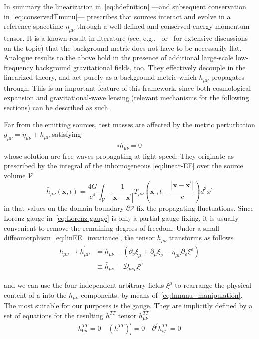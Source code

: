 In summary the linearization in~\eqref{eq:hdefinition} ---and subsequent conservation in~\eqref{eq:conservedTmunu}--- prescribes that \gw sources interact and evolve in a reference spacetime $\eta_{\mu\nu}$ through a well-defined and conserved energy-momentum tensor.
It is a known result in literature (see, e.g.,~\cite{maggiore2008gravitational} or~\cite{2017grav.book.....M} for extensive discussions on the topic) that the background metric does not have to be necessarily flat. Analogue results to the above hold in the presence of additional large-scale low-frequency background gravitational fields, too.
They effectively decouple in the linearized theory, and act purely as a background metric which $h_{\mu\nu}$ propagates through.
This is an important feature of this framework, since both cosmological expansion and gravitational-wave lensing (relevant mechanisms for the following sections) can be described as such.

Far from the emitting sources, test masses are affected by the metric perturbation
$g_{\mu\nu}=\eta_{\mu\nu}+h_{\mu\nu}$ satisfying
\begin{equation}
\square\bar{h}_{\mu\nu}=0
\end{equation}
whose solution are free waves propagating at light speed. They originate as prescribed by the integral of the inhomogeneous \eqref{eq:linear-EE} over the source volume $\mathcal{V}$
\begin{equation}
\bar{h}_{\mu\nu}\left(\boldsymbol{x},t\right)=\frac{4G}{c^{4}}\int_{\mathcal{V}}\frac{1}{\left|\boldsymbol{x}-\boldsymbol{x}^{\prime}\right|}T_{\mu\nu}\left(\boldsymbol{x}^{\prime},t-\frac{\left|\boldsymbol{x}-\boldsymbol{x}^{\prime}\right|}{c}\right)d^{3}x^{\prime}
\end{equation}
in that values on the domain boundary $\partial\mathcal{V}$ fix the propagating fluctuations.
Since Lorenz gauge in~\eqref{eq:Lorenz-gauge} is only a partial gauge fixing, it is usually convenient to remove the remaining degrees of freedom.
Under a small diffeomorphism~\eqref{eq:linEE_invariance}, the tensor $h_{\mu\nu}$ transforms as follows 
\begin{align}
	\bar{h}_{\mu\nu}\rightarrow\bar{h}_{\mu\nu}^{\prime} & =\bar{h}_{\mu\nu}-(\partial_{\nu}\xi_{\mu}+\partial_{\mu}\xi_{\nu}-\eta_{\mu\nu}\partial_{\rho}\xi^{\rho})\nonumber \\
	& \equiv\bar{h}_{\mu\nu}-\mathcal{D}_{\mu\nu\rho}\xi^{\rho}\label{eq:hmunu_manipulation}
\end{align}

and we can use the four independent arbitrary fields $\xi^{\mu}$ to rearrange the physical content of a \gw into the $h_{\mu\nu}$ components, by means of~\eqref{eq:hmunu_manipulation}. 
The most suitable for our purposes is the \ttg gauge. 
They are implicitly defined by a set of equations for the resulting $h^{TT}$ tensor
$h_{\mu\nu}^{TT}$
\begin{equation}
h_{0\mu}^{TT}=0\quad\left(h^{TT}\right)_{i}^{i}=0\quad\partial^{j}h_{ij}^{TT}=0
\end{equation}

